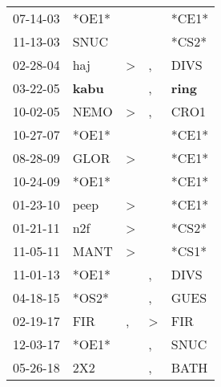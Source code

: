 \begin{supertabular}{p{0.07\textwidth}p{0.06\textwidth}p{0.02\textwidth}p{0.02\textwidth}p{0.06\textwidth}}
 07-14-03\textsuperscript{} &                            *OE1* &               &               &                            *CE1* \\
 11-13-03\textsuperscript{} &           SNUC\textsuperscript{} &               &               &                            *CS2* \\
 02-28-04\textsuperscript{} &            haj\textsuperscript{} &  \textgreater &             , &           DIVS\textsuperscript{} \\
 03-22-05\textsuperscript{} &  \textbf{kabu\textsuperscript{}} &               &             , &  \textbf{ring\textsuperscript{}} \\
 10-02-05\textsuperscript{} &           NEMO\textsuperscript{} &  \textgreater &             , &           CRO1\textsuperscript{} \\
 10-27-07\textsuperscript{} &                            *OE1* &               &               &                            *CE1* \\
 08-28-09\textsuperscript{} &           GLOR\textsuperscript{} &  \textgreater &               &                            *CE1* \\
 10-24-09\textsuperscript{} &                            *OE1* &               &               &                            *CE1* \\
 01-23-10\textsuperscript{} &           peep\textsuperscript{} &  \textgreater &               &                            *CE1* \\
 01-21-11\textsuperscript{} &            n2f\textsuperscript{} &  \textgreater &               &                            *CS2* \\
 11-05-11\textsuperscript{} &           MANT\textsuperscript{} &  \textgreater &               &                            *CS1* \\
 11-01-13\textsuperscript{} &                            *OE1* &               &             , &           DIVS\textsuperscript{} \\
 04-18-15\textsuperscript{} &                            *OS2* &               &             , &           GUES\textsuperscript{} \\
 02-19-17\textsuperscript{} &            FIR\textsuperscript{} &             , &  \textgreater &            FIR\textsuperscript{} \\
 12-03-17\textsuperscript{} &                            *OE1* &               &             , &           SNUC\textsuperscript{} \\
 05-26-18\textsuperscript{} &            2X2\textsuperscript{} &               &             , &           BATH\textsuperscript{} \\
\end{supertabular}
